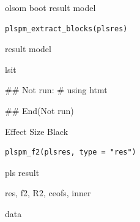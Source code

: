 \documentclass[a4paper]{book}
\begin{document}
%
\begin{Description}
olsom boot result model
\end{Description}
%
\begin{Usage}
\begin{verbatim}
plspm_extract_blocks(plsres)
\end{verbatim}
\end{Usage}
%
\begin{Arguments}
\begin{ldescription}
\item[\code{plsres}] result model
\end{ldescription}
\end{Arguments}
%
\begin{Value}
lsit
\end{Value}
%
\begin{Examples}
\begin{ExampleCode}

\#\# Not run: 
# using htmt

## End(Not run)


\end{ExampleCode}
\end{Examples}
%
\begin{Description}
Effect Size Black
\end{Description}
%
\begin{Usage}
\begin{verbatim}
plspm_f2(plsres, type = "res")
\end{verbatim}
\end{Usage}
%
\begin{Arguments}
\begin{ldescription}
\item[\code{plsres}] pls result

\item[\code{type}] res, f2, R2, ceofs, inner
\end{ldescription}
\end{Arguments}
%
\begin{Value}
data
\end{Value}
%
\end{document}
